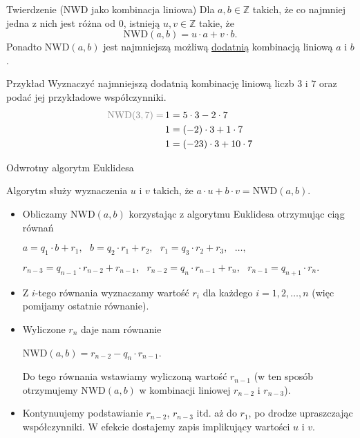 \documentclass[a4paper,10pt]{beamer}
\begin{document}
\begin{frame}

	\begin{block}{Twierdzenie (NWD jako kombinacja liniowa)}
		Dla $a,b\in\mathbb{Z}$ takich, że co najmniej jedna z nich jest różna od 0, istnieją $u,v\in\mathbb{Z}$ takie, że
		$$\mbox{NWD}(a,b)=u\cdot a+v\cdot b.$$
		Ponadto $\mbox{NWD}(a,b)$ jest najmniejszą możliwą \underline{dodatnią} kombinacją liniową $a$ i $b$.
	\end{block}

	\begin{exampleblock}{Przykład}
		Wyznaczyć najmniejszą dodatnią kombinację liniową liczb $3$ i $7$ oraz podać jej przykładowe współczynniki.
		\begin{align*}
		\textcolor{gray}{\mbox{NWD}(3,7)=\,}1&=5\cdot3-2\cdot7\\
		1&=(-2)\cdot3+1\cdot7\\
		1&=(-23)\cdot3+10\cdot7
		\end{align*}
	\end{exampleblock}

\end{frame}



\begin{frame}{Odwrotny algorytm Euklidesa}
	
	Algorytm służy wyznaczenia $u$ i $v$ takich, że $a\cdot u+b\cdot v=\mbox{NWD}(a,b)$.
	
	\begin{block}{}
		\begin{itemize}
			\item Obliczamy $\mbox{NWD}(a,b)$ korzystając z algorytmu Euklidesa otrzymując ciąg równań
			
			$a=q_1\cdot b+r_1,\ \ \ b=q_2\cdot r_1+r_2,\ \ \ r_1=q_3\cdot r_2+r_3,\ \ \ \ldots,$
			
			$r_{n-3}=q_{n-1}\cdot r_{n-2}+r_{n-1},\ \ \ r_{n-2}=q_n\cdot r_{n-1}+r_n,\ \ \ r_{n-1}=q_{n+1}\cdot r_n.$
			
			\item Z $i$-tego równania wyznaczamy wartość $r_i$ dla każdego $i=1,2,\ldots,n$ (więc pomijamy ostatnie równanie).
			
			\item Wyliczone $r_n$ daje nam równanie
			
			$\mbox{NWD}(a,b)=r_{n-2}-q_n\cdot r_{n-1}$. 
			
			Do tego równania wstawiamy wyliczoną wartość $r_{n-1}$ (w ten sposób otrzymujemy $\mbox{NWD}(a,b)$ w kombinacji liniowej $r_{n-2}$ i $r_{n-3}$).
			
			\item Kontynuujemy podstawianie $r_{n-2}$, $r_{n-3}$ itd. aż do $r_1$, po drodze upraszczając współczynniki. W efekcie dostajemy zapis implikujący wartości $u$ i $v$.
		\end{itemize}
	\end{block}
	
\end{frame}
\end{document}
